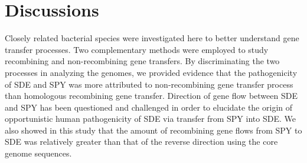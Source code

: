 \documentclass[english]{article}
\begin{document}



\clearpage{}


\section{Discussions}
Closely related bacterial species were investigated here to better
understand gene transfer processes. Two complementary methods were employed to
study recombining and non-recombining gene transfers. By discriminating the two
processes in analyzing the genomes, we provided evidence that the pathogenicity
of SDE and SPY was more attributed to non-recombining gene transfer process than
homologous recombining gene transfer.  Direction of gene flow between SDE and
SPY has been questioned and challenged
\citep{Kalia2001,Kalia2004,Towers2004,Bessen2005,Davies2007,Bessen2010} in order
to elucidate the origin of opportunistic human pathogenicity of SDE via transfer
from SPY into SDE.  We also showed in this study that the amount of recombining
gene flows from SPY to SDE was relatively greater than that of the reverse
direction using the core genome sequences.
\end{document}

